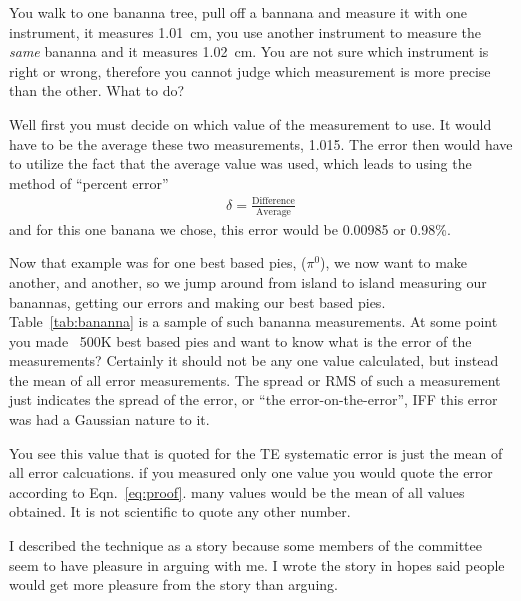 \documentclass[12pt,a4paper]{report}
\begin{document}
You walk to one bananna tree, pull off a bannana and measure it with one instrument, it measures 1.01~cm, you use another instrument to measure the \emph{same} bananna and it measures 1.02~cm. You are not sure which instrument is right or wrong, therefore you cannot judge which measurement is more precise than the other. What to do?

Well first you must decide on which value of the measurement to use. It would have to be the average these two measurements, 1.015. The error then would have to utilize the fact that the average value was used, which leads to using the method of ``percent error''
\begin{align}
\delta = \frac{\mathrm{Difference}}{\mathrm{Average}} \label{eq:proof}
\end{align}
and for this one banana we chose, this error would be
0.00985 or 0.98\%. 

Now that example was for one best based pies, ($\pi^{0}$), we now want to make another, and another, so we jump around from island to island measuring our banannas, getting our errors and making our best based pies. Table~\ref{tab:bananna} is a sample of such bananna measurements. At some point you made ~500K best based pies and want to know what is the error of the measurements? Certainly it should not be any one value calculated, but instead the mean of all error measurements. The spread or RMS of such a measurement just indicates the spread of the error, or ``the error-on-the-error'', IFF this error was had a Gaussian nature to it. 

You see this value that is quoted for the TE systematic error is just the mean of all error calcuations. if you measured only one value you would quote the error according to Eqn.~\ref{eq:proof}. many values would be the mean of all values obtained. It is not scientific to quote any other number. 

I described the technique as a story because some members of the committee seem to have pleasure in arguing with me. I wrote the story in hopes said people would get more pleasure from the story than arguing.
\FloatBarrier

\end{document}
